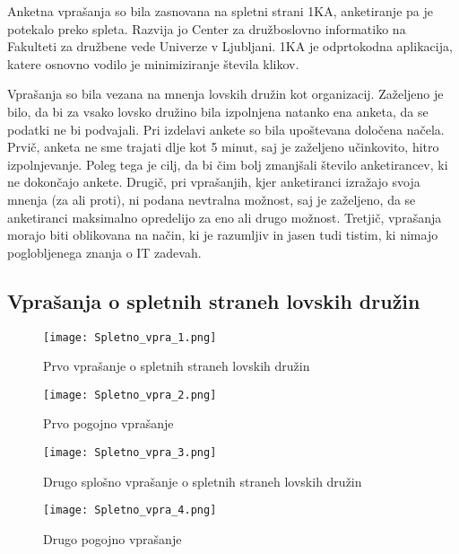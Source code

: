 \documentclass[a4paper,12pt,openright]{book}
\begin{document}
Anketna vprašanja so bila zasnovana na spletni strani 1KA, anketiranje pa je potekalo preko spleta.
Razvija jo Center za družboslovno informatiko na Fakulteti za družbene vede Univerze v Ljubljani.
1KA je odprtokodna aplikacija, katere osnovno vodilo je minimiziranje števila klikov. \cite{1ka}

Vprašanja so bila vezana na mnenja lovskih družin kot organizacij.
Zaželjeno je bilo, da bi za vsako lovsko družino bila izpolnjena natanko ena anketa, da se podatki ne bi podvajali.
Pri izdelavi ankete so bila upoštevana določena načela.
Prvič, anketa ne sme trajati dlje kot 5 minut, saj je zaželjeno učinkovito, hitro izpolnjevanje.
Poleg tega je cilj, da bi čim bolj zmanjšali število anketirancev, ki ne dokončajo ankete.
Drugič, pri vprašanjih, kjer anketiranci izražajo svoja mnenja (za ali proti), ni podana nevtralna možnost, saj je zaželjeno, da se anketiranci maksimalno opredelijo za eno ali drugo možnost.
Tretjič, vprašanja morajo biti oblikovana na način, ki je razumljiv in jasen tudi tistim, ki nimajo poglobljenega znanja o IT zadevah.

\subsection{Vprašanja o spletnih straneh lovskih družin}

\begin{figure}[h!]  
  \centering
  \begin{minipage}[b]{0.7\textwidth}  
    \centering
    \texttt{[image: Spletno\_vpra\_1.png]}
    \caption{Prvo vprašanje o spletnih straneh lovskih družin}
    \label{fig:spletno_vpra_1}
  \end{minipage}
  
  \vspace{0.5cm} %
  
  \begin{minipage}[b]{0.8\textwidth} 
    \centering
    \texttt{[image: Spletno\_vpra\_2.png]}
    \caption{Prvo pogojno vprašanje}
    \label{fig:spletno_vpra_2}
  \end{minipage}
\end{figure}

\begin{figure}[h!]  
  \centering
  \begin{minipage}[b]{\textwidth}  
    \centering
    \texttt{[image: Spletno\_vpra\_3.png]}
    \caption{Drugo splošno vprašanje o spletnih straneh lovskih družin}
    \label{fig:spletno_vpra_3}
  \end{minipage}
  
  \vspace{0.5cm} %
  
  \begin{minipage}[b]{\textwidth} 
    \centering
    \texttt{[image: Spletno\_vpra\_4.png]}
    \caption{Drugo pogojno vprašanje}
    \label{fig:spletno_vpra_4}
  \end{minipage}
  
\end{figure}
\end{document}
